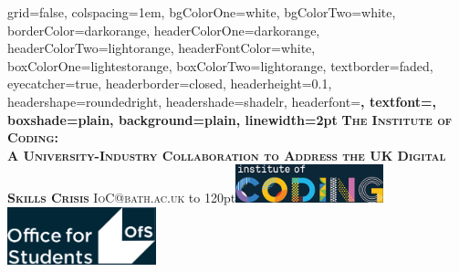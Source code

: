 \documentclass[portrait,final,a0paper,fontscale=0.277]{../../../TeX/baposter}
\begin{document}


\begin{poster}%
  {
  grid=false,
  colspacing=1em,
  bgColorOne=white,
  bgColorTwo=white,
  borderColor=darkorange,
  headerColorOne=darkorange,
  headerColorTwo=lightorange,
  headerFontColor=white,
  boxColorOne=lightestorange,
  boxColorTwo=lightorange,
  textborder=faded,
  eyecatcher=true,
  headerborder=closed,
  headerheight=0.1\textheight,
  headershape=roundedright,
  headershade=shadelr,
  headerfont=\Large\bf\textsc, %
  textfont={\setlength{\parindent}{1.5em}},
  boxshade=plain,
  background=plain,
  linewidth=2pt
  }
  {}%
  {\bf\textsc{The Institute of Coding: \\ A University-Industry Collaboration to Address the UK Digital Skills Crisis}\vspace{0.5em}}
  {\textsc{IoC@bath.ac.uk}}
  {%
  \hbox to 120pt{\vbox{\noindent \includegraphics[height=3.0em]{images/IoC.png}\\
    \includegraphics[height=4.5em]{images/OFS.png}}}
  }


\end{poster}
\end{document}
